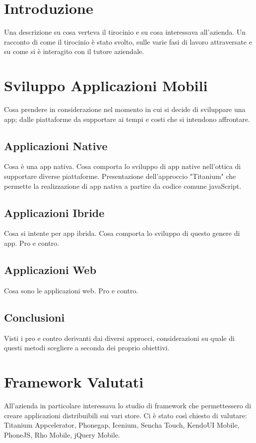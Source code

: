 \chapter{Introduzione}
	Una descrizione su cosa verteva il tirocinio e su cosa interessava 
	all'azienda. Un racconto di come il tirocinio è stato svolto, sulle varie 
	fasi di lavoro attraversate e su come si è interagito con il tutore 
	aziendale.

\chapter{Sviluppo Applicazioni Mobili}
	Cosa prendere in considerazione nel momento in cui si decide di sviluppare
	una app; dalle piattaforme da supportare ai tempi e costi che si intendono
	affrontare.
	
	\section{Applicazioni Native}
		Cosa è una app nativa. Cosa comporta lo sviluppo di app native
		nell'ottica di supportare diverse piattaforme. Presentazione
		dell'approccio "Titanium" che permette la realizzazione di app nativa a
		partire da codice comune javaScript.
		
	\section{Applicazioni Ibride}
		Cosa si intente per app ibrida. Cosa comporta lo sviluppo di questo
		genere di app. Pro e contro.
		
	\section{Applicazioni Web}
		Cosa sono le applicazioni web. Pro e contro.
		
	\section{Conclusioni}
		Visti i pro e contro derivanti dai diversi approcci, considerazioni su
		quale di questi metodi scegliere a seconda dei proprio obiettivi.
		
		
\chapter{Framework Valutati}
	All'azienda in particolare interessava lo studio di framework che
	permettessero di creare applicazioni distribuibili sui vari store.
	Ci è stato così chiesto di valutare: Titanium Appcelerator, Phonegap,
	Icenium, Sencha Touch, KendoUI Mobile, PhoneJS, Rho Mobile, jQuery Mobile.
	
